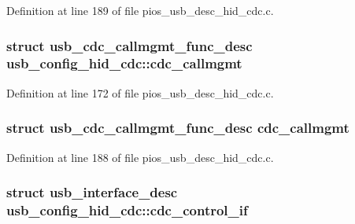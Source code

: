 Definition at line 189 of file pios\-\_\-usb\-\_\-desc\-\_\-hid\-\_\-cdc.\-c.

\hypertarget{group___p_i_o_s___u_s_b___d_e_s_c_ga1463830a390b3358935b4b39260c5762}{
\subsubsection[{cdc\-\_\-callmgmt}]{\setlength{\rightskip}{0pt plus 5cm}struct {\bf usb\-\_\-cdc\-\_\-callmgmt\-\_\-func\-\_\-desc} usb\-\_\-config\-\_\-hid\-\_\-cdc\-::cdc\-\_\-callmgmt}}\label{group___p_i_o_s___u_s_b___d_e_s_c_ga1463830a390b3358935b4b39260c5762}


Definition at line 172 of file pios\-\_\-usb\-\_\-desc\-\_\-hid\-\_\-cdc.\-c.

\hypertarget{group___p_i_o_s___u_s_b___d_e_s_c_ga97d1e106c41e1670bffdc7505b67eaef}{
\subsubsection[{cdc\-\_\-callmgmt}]{\setlength{\rightskip}{0pt plus 5cm}struct {\bf usb\-\_\-cdc\-\_\-callmgmt\-\_\-func\-\_\-desc} cdc\-\_\-callmgmt}}\label{group___p_i_o_s___u_s_b___d_e_s_c_ga97d1e106c41e1670bffdc7505b67eaef}


Definition at line 188 of file pios\-\_\-usb\-\_\-desc\-\_\-hid\-\_\-cdc.\-c.

\hypertarget{group___p_i_o_s___u_s_b___d_e_s_c_ga9cc4f55f507f420505ac9114cf7b9df3}{
\subsubsection[{cdc\-\_\-control\-\_\-if}]{\setlength{\rightskip}{0pt plus 5cm}struct {\bf usb\-\_\-interface\-\_\-desc} usb\-\_\-config\-\_\-hid\-\_\-cdc\-::cdc\-\_\-control\-\_\-if}}\label{group___p_i_o_s___u_s_b___d_e_s_c_ga9cc4f55f507f420505ac9114cf7b9df3}


